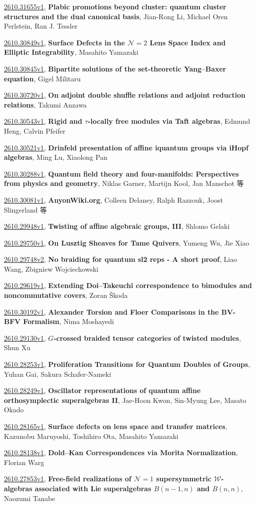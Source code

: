 \documentclass[9pt, a4paper]{article}
\theoremstyle{plain}
\theoremstyle{definition}
\theoremstyle{remark}
\newcommand{\arxiv}[3]{\href{https://arxiv.org/abs/#1}{#1}, \textbf{\textcolor{arxivblue}{#2}}, #3}
\begin{document}
\arxiv{2610.31655v1}{Plabic promotions beyond cluster: quantum cluster structures and the dual canonical basis}{Jian-Rong Li, Michael Oren Perlstein, Ran J. Tessler}

\arxiv{2610.30849v1}{Surface Defects in the $\mathcal{N}=2$ Lens Space Index and Elliptic Integrability}{Masahito Yamazaki}

\arxiv{2610.30845v1}{Bipartite solutions of the set-theoretic Yang--Baxer equation}{Gigel Militaru}

\arxiv{2610.30720v1}{On adjoint double shuffle relations and adjoint reduction relations}{Takumi Anzawa}

\arxiv{2610.30543v1}{Rigid and $τ$-locally free modules via Taft algebras}{Edmund Heng, Calvin Pfeifer}

\arxiv{2610.30521v1}{Drinfeld presentation of affine iquantum groups via iHopf algebras}{Ming Lu, Xiaolong Pan}

\arxiv{2610.30288v1}{Quantum field theory and four-manifolds: Perspectives from physics and geometry}{Niklas Garner, Martijn Kool, Jan Manschot 等}

\arxiv{2610.30081v1}{AnyonWiki.org}{Colleen Delaney, Ralph Razzouk, Joost Slingerland 等}

\arxiv{2610.29948v1}{Twisting of affine algebraic groups, III}{Shlomo Gelaki}

\arxiv{2610.29750v1}{On Lusztig Sheaves for Tame Quivers}{Yumeng Wu, Jie Xiao}

\arxiv{2610.29748v2}{No braiding for quantum sl2 reps - A short proof}{Liao Wang, Zbigniew Wojciechowski}

\arxiv{2610.29619v1}{Extending Doi--Takeuchi correspondence to bimodules and noncommutative covers}{Zoran Škoda}

\arxiv{2610.30192v1}{Alexander Torsion and Floer Comparisons in the BV-BFV Formalism}{Nima Moshayedi}

\arxiv{2610.29130v1}{$G$-crossed braided tensor categories of twisted modules}{Shun Xu}

\arxiv{2610.28253v1}{Proliferation Transitions for Quantum Doubles of Groups}{Yuhan Gai, Sakura Schafer-Nameki}

\arxiv{2610.28249v1}{Oscillator representations of quantum affine orthosymplectic superalgebras II}{Jae-Hoon Kwon, Sin-Myung Lee, Masato Okado}

\arxiv{2610.28165v1}{Surface defects on lens space and transfer matrices}{Kazunobu Maruyoshi, Toshihiro Ota, Masahito Yamazaki}

\arxiv{2610.28138v1}{Dold--Kan Correspondences via Morita Normalization}{Florian Warg}

\arxiv{2610.27853v1}{Free-field realizations of $\mathcal{N} = 1$ supersymmetric $\mathcal{W}$-algebras associated with Lie superalgebras $B (n - 1 , n)$ and $B (n , n)$}{Naozumi Tanabe}

\end{document}
